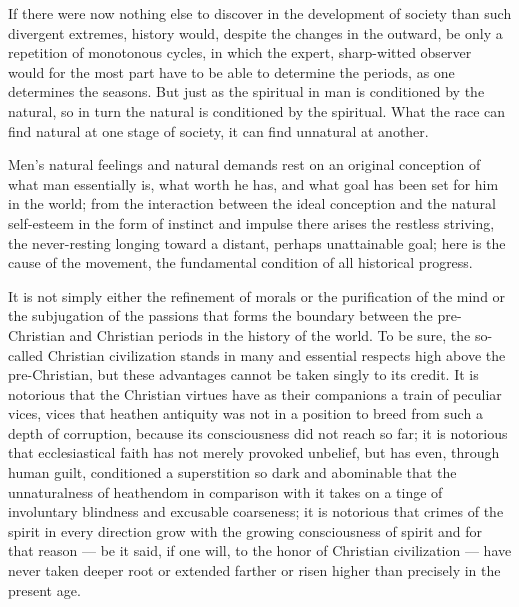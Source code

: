 \documentclass[12pt,a4paper,openany]{book}
\newcommand{\opage}[1]{\marginnote{\footnotesize\textit{[#1]}}}
\begin{document}
If there were now nothing else to discover in the development of society
than such divergent extremes, history would, despite the changes in
the outward, be only a repetition of monotonous cycles, in which the expert,
sharp-witted observer would for the most part have to be able to determine
the periods, as one determines the seasons.
But just as the spiritual in man is conditioned by the
natural, so in turn the natural is conditioned by the
spiritual. What the race can find natural at one stage of society,
it can find unnatural at another.

Men's natural feelings and natural demands
rest on an original conception of what man essentially
is, what worth he has, and what goal has been set for him in the
world; from the interaction between the ideal conception
and the natural self-esteem in the form of instinct and impulse
there arises the restless striving, the never-resting
longing toward a distant, perhaps unattainable goal; here is
\setcounter{footnote}{0}%
\opage{294}the cause of the movement, the fundamental condition of all historical
progress.

It is not simply either the refinement of morals or
the purification of the mind or the subjugation of the passions that
forms the boundary between the pre-Christian and Christian
periods in the history of the world. To be sure, the so-called
Christian civilization stands in many and essential respects high
above the pre-Christian, but these advantages cannot be taken
singly to its credit. It is notorious that the Christian
virtues have as their companions a train of peculiar vices,
vices that heathen antiquity was not in a position
to breed from such a depth of corruption, because its
consciousness did not reach so far; it is notorious that ecclesiastical
faith has not merely provoked unbelief, but has even, through
human guilt, conditioned a superstition so dark and
abominable that the unnaturalness of heathendom in comparison
with it takes on a tinge of involuntary blindness
and excusable coarseness; it is notorious that crimes of the spirit
in every direction grow with the growing consciousness
of spirit and for that reason --- be it said, if
one will, to the honor of Christian civilization --- have never
taken deeper root or extended farther or
risen higher than precisely in the present age.
\end{document}
